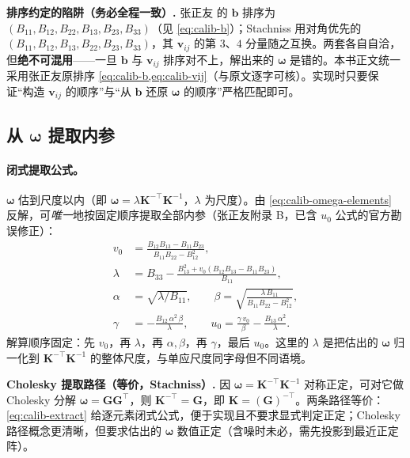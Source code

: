 \begin{note}
\textbf{排序约定的陷阱（务必全程一致）.}\;
张正友\cite{zhang2000calibration} 的 $\mathbf{b}$ 排序为 $(B_{11},B_{12},B_{22},B_{13},B_{23},B_{33})$（见 \cref{eq:calib-b}）；Stachniss\cite{stachniss2021zhang} 用对角优先的 $(B_{11},B_{12},B_{13},B_{22},B_{23},B_{33})$，其 $\mathbf{v}_{ij}$ 的第 $3$、$4$ 分量随之互换。两套各自自洽，但\textbf{绝不可混用}——一旦 $\mathbf{b}$ 与 $\mathbf{v}_{ij}$ 排序对不上，解出来的 $\boldsymbol{\omega}$ 是错的。本书正文统一采用张正友原排序 \cref{eq:calib-b,eq:calib-vij}（与原文逐字可核）。实现时只要保证“构造 $\mathbf{v}_{ij}$ 的顺序”与“从 $\mathbf{b}$ 还原 $\boldsymbol{\omega}$ 的顺序”严格匹配即可。
\end{note}

\subsection{从 $\boldsymbol{\omega}$ 提取内参}
\label{sec:calib-extract-K}

\paragraph{闭式提取公式。}
$\boldsymbol{\omega}$ 估到尺度以内（即 $\boldsymbol{\omega}=\lambda\mathbf{K}^{-\top}\mathbf{K}^{-1}$，$\lambda$ 为尺度）。由 \cref{eq:calib-omega-elements} 反解，可\emph{唯一}地按固定顺序提取全部内参（张正友附录 B\cite{zhang2000calibration}，已含 $u_0$ 公式的官方勘误修正）：
\begin{equation}
  \begin{aligned}
  v_0 &= \frac{B_{12}B_{13}-B_{11}B_{23}}{B_{11}B_{22}-B_{12}^2},\\[1ex]
  \lambda &= B_{33}-\frac{B_{13}^2+v_0(B_{12}B_{13}-B_{11}B_{23})}{B_{11}},\\[1ex]
  \alpha &= \sqrt{\lambda/B_{11}},\qquad
  \beta = \sqrt{\frac{\lambda\,B_{11}}{B_{11}B_{22}-B_{12}^2}},\\[1ex]
  \gamma &= -\frac{B_{12}\,\alpha^2\,\beta}{\lambda},\qquad
  u_0 = \frac{\gamma\,v_0}{\beta}-\frac{B_{13}\,\alpha^2}{\lambda}.
  \end{aligned}
  \label{eq:calib-extract}
\end{equation}
解算顺序固定：先 $v_0$，再 $\lambda$，再 $\alpha,\beta$，再 $\gamma$，最后 $u_0$。这里的 $\lambda$ 是把估出的 $\boldsymbol{\omega}$ 归一化到 $\mathbf{K}^{-\top}\mathbf{K}^{-1}$ 的整体尺度，与单应尺度同字母但不同语境。

\begin{note}
\textbf{Cholesky 提取路径（等价，Stachniss\cite{stachniss2021zhang}）.}\;
因 $\boldsymbol{\omega}=\mathbf{K}^{-\top}\mathbf{K}^{-1}$ 对称正定，可对它做 Cholesky 分解 $\boldsymbol{\omega}=\mathbf{G}\mathbf{G}^\top$，则 $\mathbf{K}^{-\top}=\mathbf{G}$，即 $\mathbf{K}=(\mathbf{G})^{-\top}$。两条路径等价：\cref{eq:calib-extract} 给逐元素闭式公式，便于实现且不要求显式判定正定；Cholesky 路径概念更清晰，但要求估出的 $\boldsymbol{\omega}$ 数值正定（含噪时未必，需先投影到最近正定阵）。
\end{note}

